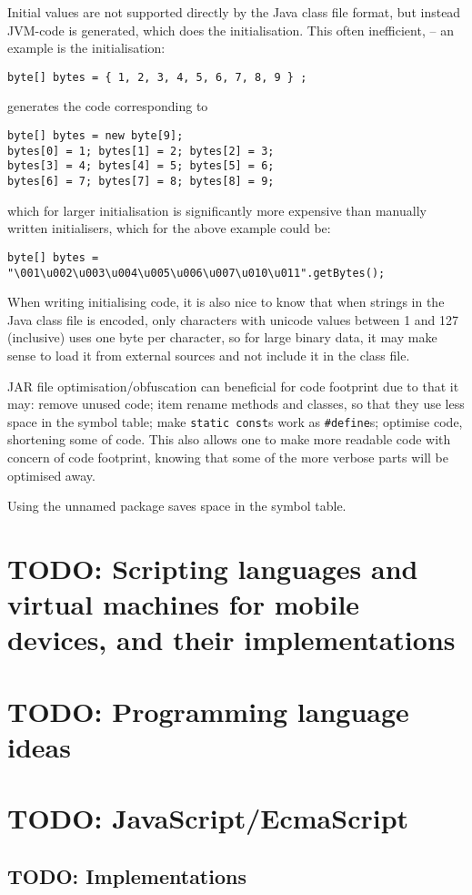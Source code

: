 Initial values are not supported directly by the Java class file format, but instead
JVM-code is generated, which does the initialisation. 
This often inefficient, -- an example is the initialisation:
\begin{verbatim}
byte[] bytes = { 1, 2, 3, 4, 5, 6, 7, 8, 9 } ;
\end{verbatim}
generates the code corresponding to
\begin{verbatim}
byte[] bytes = new byte[9];
bytes[0] = 1; bytes[1] = 2; bytes[2] = 3;
bytes[3] = 4; bytes[4] = 5; bytes[5] = 6;
bytes[6] = 7; bytes[7] = 8; bytes[8] = 9;
\end{verbatim}
which for larger initialisation is significantly more expensive than manually written initialisers,
which for the above example could be:
\begin{verbatim}
byte[] bytes = "\001\u002\u003\u004\u005\u006\u007\u010\u011".getBytes();
\end{verbatim}
When writing initialising code, it is also nice to know that when strings in the Java class file is encoded, only characters with unicode values between 1 and 127 (inclusive) uses one byte per character, so for large binary data, it may make sense to load it from external sources and not include it in the class file.

JAR file optimisation/obfuscation can beneficial for code footprint due to that it may:
remove unused code;
item rename methods and classes, so that they use less space in the symbol table;
make \verb|static const|s work as \verb|#define|s;
optimise code, shortening some of code.
This also allows one to make more readable code with concern of code footprint, knowing that some of the more verbose parts will be optimised away.

Using the unnamed package saves space in the symbol table.


\section{TODO: Scripting languages and virtual machines for mobile devices, and their implementations}
\section{TODO: Programming language ideas}
\section{TODO: JavaScript/EcmaScript}
\subsection{TODO: Implementations}
